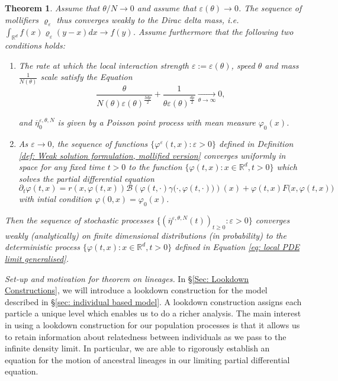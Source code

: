 \documentclass[12pt]{article}
\newtheorem{theorem}{Theorem}[section]
\newcommand{\plr}[1]{\todo[inline]{Peter: #1}}
\newcommand{\comment}[1]{{\color{blue} \it #1}}
\begin{document}
\plr{Main theorem 2:}

\begin{theorem}\label{teo: Main Convergence Theorem - local pde limit}
 Assume that $\theta/ N \to 0 $ and assume that $\varepsilon(\theta) \to 0$. The sequence of mollifiers $\varrho_{\varepsilon}$ thus converges weakly to the Dirac delta mass, i.e. 
$\int_{\mathbb{R}^d} f(x)\varrho_{\varepsilon}(y-x)dx \to f(y)$. Assume furthermore that the following two conditions holds:
\begin{enumerate}
    \item The rate at which the local interaction strength $\varepsilon:=\varepsilon(\theta)$, speed $\theta$ and mass $\frac{1}{N(\theta)}$ scale satisfy the Equation 
\begin{equation} \label{condepsilon}
\frac{\theta}{N(\theta) \varepsilon(\theta)^{\frac{3 d p}{2}}} + \frac{1}{\theta \varepsilon(\theta)^{\frac{d p}{2}}} \xrightarrow[\theta \rightarrow \infty]{} 0,
\end{equation}

and $\overline{\eta}^{\varepsilon,\theta,N}_0$ is given by a Poisson point process with mean measure $\varphi_0(x)$.
    \item As $\varepsilon \to 0$, the sequence of functions $\{\varphi^\varepsilon(t,x): \varepsilon > 0 \}$ defined in Definition \ref{def: Weak solution formulation, mollified version} converges uniformly in space for any fixed time $t > 0$ to the function $\{\varphi(t,x): x \in \mathbb{R}^d, t >0\}$  which solves the partial differential equation 
    \begin{equation}\label{eq: local PDE limit generalised}
    \partial_t \varphi(t,x)=r(x,\varphi(t,x))\mathcal{B}\left(\varphi(t,\cdot) \gamma\big(\cdot,\varphi(t,\cdot)\big)\right)(x)+ \varphi(t,x)F\big(x,\varphi(t,x)\big)    
    \end{equation}
    with intial condition $\varphi(0,x)=\varphi_0(x)$.
\end{enumerate}
Then the sequence of stochastic processes $\{(\overline{\eta}^{\varepsilon, \theta,N}(t))_{t \geq 0}: \varepsilon > 0\}$ converges weakly (analytically) on finite dimensional distributions (in probability) to the deterministic process $\{\varphi(t,x): x \in \mathbb{R}^d, t >0\}$ defined in Equation \eqref{eq: local PDE limit generalised}.
\end{theorem}


\comment{Set-up and motivation for theorem on lineages.}
In \S \ref{Sec: Lookdown Constructions}, we will introduce a lookdown construction for the model described in \S \ref{sec: individual based model}. A lookdown construction assigns each particle a unique level which enables us to do a richer analysis. The main interest in using a lookdown construction for our
population processes is that it allows us to retain information 
about relatedness between individuals as we pass to the infinite
density limit. In particular, we are able to rigorously establish an equation for the motion of ancestral lineages in our limiting partial differential equation.
 
\end{document}
